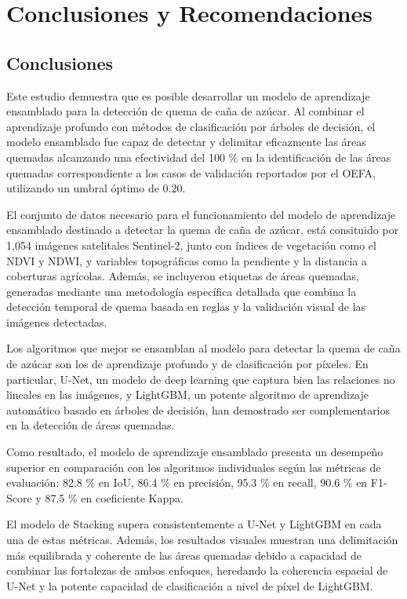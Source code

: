 \section{Conclusiones y Recomendaciones}
\subsection{Conclusiones}

Este estudio demuestra que es posible desarrollar un modelo de aprendizaje ensamblado para la detección 
de quema de caña de azúcar. Al combinar el aprendizaje profundo con métodos de clasificación por árboles de decisión, 
el modelo ensamblado fue capaz de detectar y delimitar eficazmente las áreas quemadas alcanzando una efectividad 
del 100 \% en la identificación de las áreas quemadas correspondiente a los casos de validación reportados por el OEFA, 
utilizando un umbral óptimo de $0.20$.

El conjunto de datos necesario para el funcionamiento del modelo de aprendizaje ensamblado destinado a 
detectar la quema de caña de azúcar, está consituido por 1,054 imágenes satelitales Sentinel-2, junto con índices de vegetación 
como el NDVI y NDWI, y variables topográficas como la pendiente y la distancia a coberturas agrícolas. Además, se incluyeron 
etiquetas de áreas quemadas, generadas mediante una metodología específica detallada que combina la detección temporal de quema 
basada en reglas y la validación visual de las imágenes detectadas. 

Los algoritmos que mejor se ensamblan al modelo para detectar la quema de caña de azúcar son los de aprendizaje 
profundo y de clasificación por píxeles. En particular, U-Net, un modelo de deep learning que captura bien las relaciones no lineales 
en las imágenes, y LightGBM, un potente algoritmo de aprendizaje automático basado en árboles de decisión, han demostrado ser complementarios en la detección 
de áreas quemadas.

Como resultado, el modelo de aprendizaje ensamblado presenta un desempeño superior en comparación con los algoritmos individuales según las métricas de evaluación: 
82.8 \% en IoU, 86.4 \% en precisión, 95.3 \% en recall, 90.6 \% en F1-Score y 87.5 \% en coeficiente Kappa. 

El modelo de Stacking supera consistentemente a U-Net y LightGBM en cada una de estas 
métricas. Además, los resultados visuales muestran una delimitación más equilibrada y coherente de las áreas quemadas debido a capacidad de combinar las fortalezas de ambos enfoques, heredando la 
coherencia espacial de U-Net y la potente capacidad de clasificación a nivel de píxel de LightGBM.

